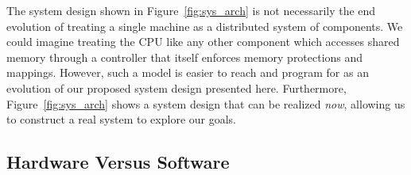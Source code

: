 {    




    The system design shown in
    Figure~\ref{fig:sys_arch} is not necessarily the end evolution of treating a single machine as a
    distributed system of components. We could imagine treating the CPU like any other component which
    accesses shared memory through a controller that itself enforces memory protections and mappings.
    However, such a model is easier to reach and program for as an evolution of our proposed system
    design presented here. Furthermore, Figure~\ref{fig:sys_arch} shows a system design that can be
    realized \emph{now}, allowing us to construct a real system to explore our goals.


}


\subsection{Hardware Versus Software}

